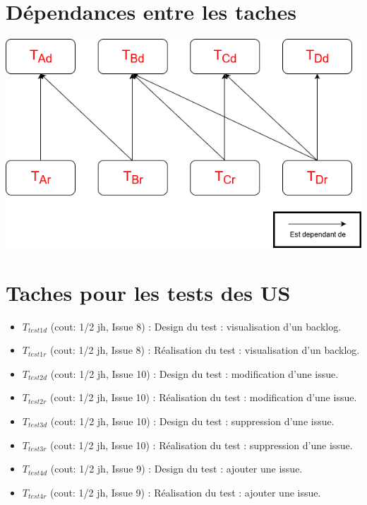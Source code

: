 \documentclass[french]{article}
\begin{document}
\section{Dépendances entre les taches}
\includegraphics[scale=0.55]{task_dependancy_sprint_1.png}

\section{Taches pour les tests des US}
\begin{itemize}
    \item $T_{test1d}$ (cout: 1/2 jh, Issue 8) : Design du test : visualisation d'un backlog.
    \item $T_{test1r}$ (cout: 1/2 jh, Issue 8) : Réalisation du test : visualisation d'un backlog.
    \item $T_{test2d}$ (cout: 1/2 jh, Issue 10) : Design du test : modification d'une issue.
    \item $T_{test2r}$ (cout: 1/2 jh, Issue 10) : Réalisation du test : modification d'une issue.
    \item $T_{test3d}$ (cout: 1/2 jh, Issue 10) : Design du test : suppression d'une issue.
    \item $T_{test3r}$ (cout: 1/2 jh, Issue 10) : Réalisation du test : suppression d'une issue.
    \item $T_{test4d}$ (cout: 1/2 jh, Issue 9) : Design du test : ajouter une issue.
    \item $T_{test4r}$ (cout: 1/2 jh, Issue 9) : Réalisation du test : ajouter une issue.
\end{itemize}
\end{document}
